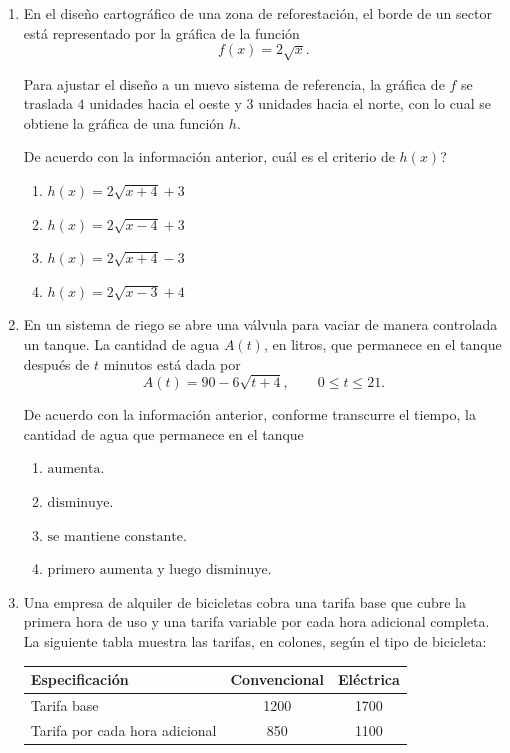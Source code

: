 \documentclass[12pt]{article}
\newcommand{\opcion}[2]{\item $#2$}
\begin{document}
\begin{enumerate}[label=\textbf{\arabic*.}, start=29, itemsep=1cm]
\Needspace{0.38\textheight}
\item
En el dise\~no cartogr\'afico de una zona de reforestaci\'on, el borde de un sector est\'a representado por la gr\'afica de la funci\'on
\[
  f(x)=2\sqrt{x}.
\]

Para ajustar el dise\~no a un nuevo sistema de referencia, la gr\'afica de $f$ se traslada $4$ unidades hacia el oeste y $3$ unidades hacia el norte, con lo cual se obtiene la gr\'afica de una funci\'on $h$.

De acuerdo con la informaci\'on anterior, \textquestiondown cu\'al es el criterio de $h(x)$?

\begin{enumerate}[label=\Alph*)]
  \opcion{A}{h(x)=2\sqrt{x+4}+3}
  \opcion{B}{h(x)=2\sqrt{x-4}+3}
  \opcion{C}{h(x)=2\sqrt{x+4}-3}
  \opcion{D}{h(x)=2\sqrt{x-3}+4}
\end{enumerate}

\Needspace{0.32\textheight}
\item
En un sistema de riego se abre una v\'alvula para vaciar de manera controlada un tanque. La cantidad de agua $A(t)$, en litros, que permanece en el tanque despu\'es de $t$ minutos est\'a dada por
\[
  A(t)=90-6\sqrt{t+4}, \qquad 0\leq t\leq 21.
\]

De acuerdo con la informaci\'on anterior, conforme transcurre el tiempo, la cantidad de agua que permanece en el tanque

\begin{enumerate}[label=\Alph*)]
  \opcion{A}{\text{aumenta.}}
  \opcion{B}{\text{disminuye.}}
  \opcion{C}{\text{se mantiene constante.}}
  \opcion{D}{\text{primero aumenta y luego disminuye.}}
\end{enumerate}

\Needspace{0.52\textheight}
\item
Una empresa de alquiler de bicicletas cobra una tarifa base que cubre la primera hora de uso y una tarifa variable por cada hora adicional completa. La siguiente tabla muestra las tarifas, en colones, seg\'un el tipo de bicicleta:

\begin{center}
\renewcommand{\arraystretch}{1.25}
\begin{tabular}{|l|c|c|}
\hline
\textbf{Especificaci\'on} & \textbf{Convencional} & \textbf{El\'ectrica} \\
\hline
Tarifa base & 1200 & 1700 \\
\hline
Tarifa por cada hora adicional & 850 & 1100 \\
\hline
\end{tabular}
\end{center}


\end{enumerate}
\end{document}

